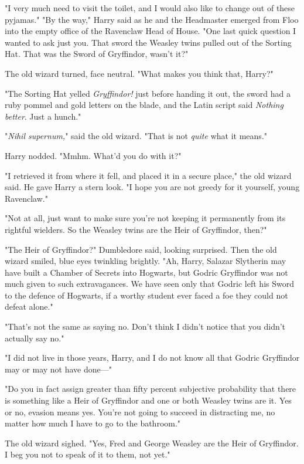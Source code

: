 "I very much need to visit the toilet, and I would also like to change out of
these pyjamas."
\later
"By the way," Harry said as he and the Headmaster emerged from Floo into the
empty office of the Ravenclaw Head of House. "One last quick question I wanted
to ask just you. That sword the Weasley twins pulled out of the Sorting Hat.
That was the Sword of Gryffindor, wasn't it?"

The old wizard turned, face neutral. "What makes you think that, Harry?"

"The Sorting Hat yelled \emph{Gryffindor!} just before handing it out, the
sword had a ruby pommel and gold letters on the blade, and the Latin script
said \emph{Nothing better}. Just a hunch."

"\emph{Nihil supernum,}" said the old wizard. "That is not \emph{quite} what it
means."

Harry nodded. "Mmhm. What'd you do with it?"

"I retrieved it from where it fell, and placed it in a secure place," the old
wizard said. He gave Harry a stern look. "I hope you are not greedy for it
yourself, young Ravenclaw."

"Not at all, just want to make sure you're not keeping it permanently from its
rightful wielders. So the Weasley twins are the Heir of Gryffindor, then?"

"The Heir of Gryffindor?" Dumbledore said, looking surprised. Then the old
wizard smiled, blue eyes twinkling brightly. "Ah, Harry, Salazar Slytherin may
have built a Chamber of Secrets into Hogwarts, but Godric Gryffindor was not
much given to such extravagances. We have seen only that Godric left his Sword
to the defence of Hogwarts, if a worthy student ever faced a foe they could not
defeat alone."

"That's not the same as saying no. Don't think I didn't notice that you didn't
actually say no."

"I did not live in those years, Harry, and I do not know all that Godric
Gryffindor may or may not have done—"

"Do you in fact assign greater than fifty percent subjective probability that
there is something like a Heir of Gryffindor and one or both Weasley twins are
it. Yes or no, evasion means yes. You're not going to succeed in distracting
me, no matter how much I have to go to the bathroom."

The old wizard sighed. "Yes, Fred and George Weasley are the Heir of
Gryffindor. I beg you not to speak of it to them, not yet."

